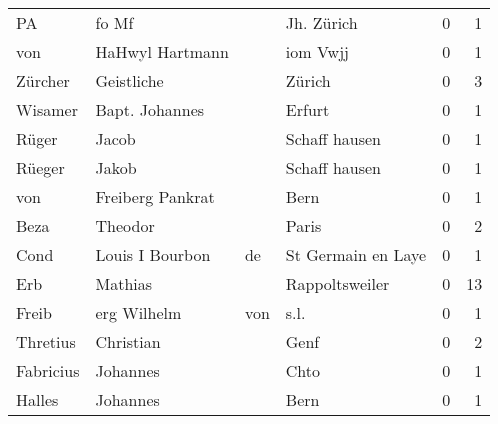 \begin{tabular}{llllrr}
                       PA &                              fo Mf &             &                                  Jh. Zürich &          0 &         1 \\
                      von &                    HaHwyl Hartmann &             &                                    iom Vwjj &          0 &         1 \\
                  Zürcher &                         Geistliche &             &                                      Zürich &          0 &         3 \\
                  Wisamer &                     Bapt. Johannes &             &                                      Erfurt &          0 &         1 \\
                    Rüger &                              Jacob &             &                               Schaff hausen &          0 &         1 \\
                   Rüeger &                              Jakob &             &                               Schaff hausen &          0 &         1 \\
                      von &                   Freiberg Pankrat &             &                                        Bern &          0 &         1 \\
                     Beza &                            Theodor &             &                                       Paris &          0 &         2 \\
                     Cond &                   Louis I  Bourbon &          de &                          St Germain en Laye &          0 &         1 \\
                      Erb &                            Mathias &             &                              Rappoltsweiler &          0 &        13 \\
                    Freib &                        erg Wilhelm &         von &                                        s.l. &          0 &         1 \\
                 Thretius &                          Christian &             &                                        Genf &          0 &         2 \\
                Fabricius &                           Johannes &             &                                        Chto &          0 &         1 \\
                   Halles &                           Johannes &             &                                        Bern &          0 &         1 \\

\end{tabular}
